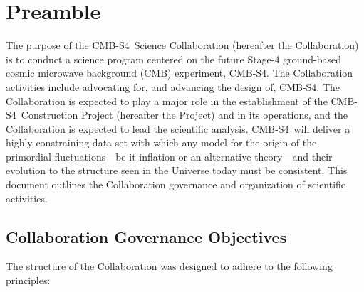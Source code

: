 \documentclass[12pt]{article}
\newcommand{\Comment}[1]{\textcolor{Blue}{(Comment: #1)}}
\newcommand\collabname{CMB-S4}
\begin{document}
\thispagestyle{empty}

\newpage

\tableofcontents


\newpage


\section{Preamble}

The purpose of the \collabname\ Science Collaboration (hereafter the Collaboration) is to conduct a science program centered on the future Stage-4 ground-based cosmic microwave background (CMB) experiment, \collabname. The Collaboration activities include advocating for, and advancing the design of, \collabname. The Collaboration is expected to play a major role in the establishment of the \collabname\ Construction Project (hereafter the Project) and in its operations, and the Collaboration is expected to lead the scientific analysis. 
\collabname\ will deliver a highly constraining data set with which any model for the origin of the primordial fluctuations---be it inflation or an alternative theory---and their evolution to the structure seen in the Universe today must be consistent. 
This document outlines the Collaboration governance and organization of scientific activities.

\subsection{Collaboration Governance Objectives}
 The structure of the Collaboration was designed to adhere to the following principles:
\end{document}
